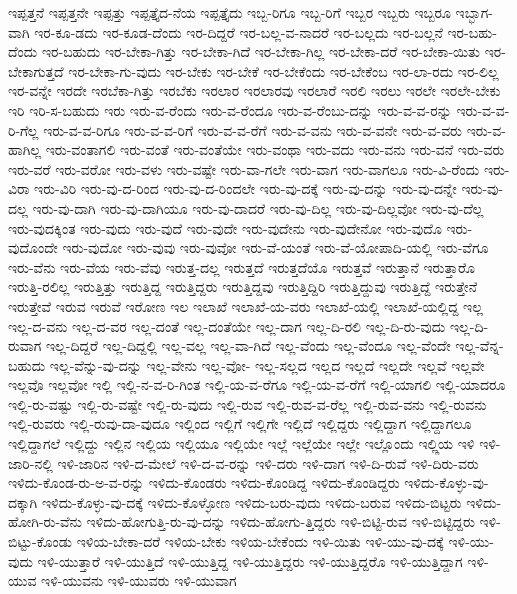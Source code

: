 {ಇಪ್ಪತ್ತನೆ
ಇಪ್ಪತ್ತನೇ
ಇಪ್ಪತ್ತು
ಇಪ್ಪತ್ತೈದ-ನೆಯ
ಇಪ್ಪತ್ತೈದು
ಇಬ್ಬ-ರಿಗೂ
ಇಬ್ಬ-ರಿಗೆ
ಇಬ್ಬರ
ಇಬ್ಬರು
ಇಬ್ಬರೂ
ಇಬ್ಭಾಗ-ವಾಗಿ
ಇರ-ಕೂ-ಡದು
ಇರ-ಕೂಡ-ದೆಂದು
ಇರ-ದಿದ್ದರೆ
ಇರ-ಬಲ್ಲ-ವ-ನಾದರೆ
ಇರ-ಬಲ್ಲದು
ಇರ-ಬಲ್ಲನೆ
ಇರ-ಬಹು-ದೆಂದು
ಇರ-ಬಹುದು
ಇರ-ಬೇಕಾ-ಗಿತ್ತು
ಇರ-ಬೇಕಾ-ಗಿದೆ
ಇರ-ಬೇಕಾ-ಗಿಲ್ಲ
ಇರ-ಬೇಕಾ-ದರೆ
ಇರ-ಬೇಕಾ-ಯಿತು
ಇರ-ಬೇಕಾಗುತ್ತದೆ
ಇರ-ಬೇಕಾ-ಗು-ವುದು
ಇರ-ಬೇಕು
ಇರ-ಬೇಕೆ
ಇರ-ಬೇಕೆಂದು
ಇರ-ಬೇಕೆಂಬ
ಇರ-ಲಾ-ರದು
ಇರ-ಲಿಲ್ಲ
ಇರ-ವನ್ನೇ
ಇರದೇ
ಇರಬೆಕಾ-ಗಿತ್ತು
ಇರಬೆಕು
ಇರಲಾರ
ಇರಲಾರವು
ಇರಲಾರೆ
ಇರಲಿ
ಇರಲು
ಇರಲೇ
ಇರಲೇ-ಬೇಕು
ಇರಿ
ಇರಿ-ಸ-ಬಹುದು
ಇರು
ಇರು-ವ-ರೆಂದು
ಇರು-ವ-ರೆಂದೂ
ಇರು-ವ-ರೆಂಬು-ದನ್ನು
ಇರು-ವ-ವ-ರನ್ನು
ಇರು-ವ-ವ-ರಿ-ಗೆಲ್ಲ
ಇರು-ವ-ವ-ರಿಗೂ
ಇರು-ವ-ವ-ರಿಗೆ
ಇರು-ವ-ವ-ರೆಗೆ
ಇರು-ವ-ವನು
ಇರು-ವ-ವನೇ
ಇರು-ವ-ವರು
ಇರು-ವ-ಹಾಗಿಲ್ಲ
ಇರು-ವಂತಾಗಲಿ
ಇರು-ವಂತೆ
ಇರು-ವಂತೆಯೇ
ಇರು-ವಂಥಾ
ಇರು-ವದು
ಇರು-ವನು
ಇರು-ವನೆ
ಇರು-ವರು
ಇರು-ವರೆ
ಇರು-ವರೋ
ಇರು-ವಳು
ಇರು-ವಷ್ಟೇ
ಇರು-ವಾ-ಗಲೇ
ಇರು-ವಾಗ
ಇರು-ವಾಗಲೂ
ಇರು-ವಿ-ರೆಂದು
ಇರು-ವಿರಾ
ಇರು-ವಿರಿ
ಇರು-ವು-ದ-ರಿಂದ
ಇರು-ವು-ದ-ರಿಂದಲೇ
ಇರು-ವು-ದಕ್ಕೆ
ಇರು-ವು-ದನ್ನು
ಇರು-ವು-ದನ್ನೇ
ಇರು-ವು-ದಲ್ಲ
ಇರು-ವು-ದಾಗಿ
ಇರು-ವು-ದಾಗಿಯೂ
ಇರು-ವು-ದಾದರೆ
ಇರು-ವು-ದಿಲ್ಲ
ಇರು-ವು-ದಿಲ್ಲವೋ
ಇರು-ವು-ದೆಲ್ಲ
ಇರು-ವುದಕ್ಕಿಂತ
ಇರು-ವುದು
ಇರು-ವುದೆ
ಇರು-ವುದೇ
ಇರು-ವುದೇನು
ಇರು-ವುದೇನೋ
ಇರು-ವುದೊ
ಇರು-ವುದೊಂದೇ
ಇರು-ವುದೋ
ಇರು-ವುವು
ಇರು-ವುವೋ
ಇರು-ವೆ-ಯಂತೆ
ಇರು-ವೆ-ಯೋಪಾದಿ-ಯಲ್ಲಿ
ಇರು-ವೆಗೂ
ಇರು-ವೆನು
ಇರು-ವೆಯ
ಇರು-ವೆವು
ಇರುತ್ತ-ದಲ್ಲ
ಇರುತ್ತದೆ
ಇರುತ್ತದೆಯೊ
ಇರುತ್ತವೆ
ಇರುತ್ತಾನೆ
ಇರುತ್ತಾರೊ
ಇರುತ್ತಿ-ರಲಿಲ್ಲ
ಇರುತ್ತಿತ್ತು
ಇರುತ್ತಿದ್ದ
ಇರುತ್ತಿದ್ದರು
ಇರುತ್ತಿದ್ದವು
ಇರುತ್ತಿದ್ದಿರಿ
ಇರುತ್ತಿದ್ದುವು
ಇರುತ್ತಿದ್ದೆ
ಇರುತ್ತೇನೆ
ಇರುತ್ತೇವೆ
ಇರುವ
ಇರುವೆ
ಇರೋಣ
ಇಲ
ಇಲಾಖೆ
ಇಲಾಖೆ-ಯ-ವರು
ಇಲಾಖೆ-ಯಲ್ಲಿ
ಇಲಾಖೆ-ಯಲ್ಲಿದ್ದ
ಇಲ್ಲ
ಇಲ್ಲ-ದ-ವನು
ಇಲ್ಲ-ದ-ವರ
ಇಲ್ಲ-ದಂತೆ
ಇಲ್ಲ-ದಂತೆಯೇ
ಇಲ್ಲ-ದಾಗ
ಇಲ್ಲ-ದಿ-ರಲಿ
ಇಲ್ಲ-ದಿ-ರು-ವುದು
ಇಲ್ಲ-ದಿ-ರುವಾಗ
ಇಲ್ಲ-ದಿದ್ದರೆ
ಇಲ್ಲ-ದಿದ್ದಲ್ಲಿ
ಇಲ್ಲ-ವಲ್ಲ
ಇಲ್ಲ-ವಾ-ಗಿದೆ
ಇಲ್ಲ-ವೆಂದು
ಇಲ್ಲ-ವೆಂದೂ
ಇಲ್ಲ-ವೆಂದೇ
ಇಲ್ಲ-ವೆನ್ನ-ಬಹುದು
ಇಲ್ಲ-ವೆನ್ನು-ವು-ದನ್ನು
ಇಲ್ಲ-ವೇನು
ಇಲ್ಲ-ವೋ-
ಇಲ್ಲ-ಸಲ್ಲದ
ಇಲ್ಲದ
ಇಲ್ಲದೆ
ಇಲ್ಲದೇ
ಇಲ್ಲವೆ
ಇಲ್ಲವೇ
ಇಲ್ಲವೊ
ಇಲ್ಲವೋ
ಇಲ್ಲಿ
ಇಲ್ಲಿ-ನ-ವ-ರಿ-ಗಿಂತ
ಇಲ್ಲಿ-ಯ-ವ-ರೆಗೂ
ಇಲ್ಲಿ-ಯ-ವ-ರೆಗೆ
ಇಲ್ಲಿ-ಯಾಗಲಿ
ಇಲ್ಲಿ-ಯಾದರೂ
ಇಲ್ಲಿ-ರು-ವಷ್ಟು
ಇಲ್ಲಿ-ರು-ವಷ್ಟೇ
ಇಲ್ಲಿ-ರು-ವುದು
ಇಲ್ಲಿ-ರುವ
ಇಲ್ಲಿ-ರುವ-ವ-ರೆಲ್ಲ
ಇಲ್ಲಿ-ರುವ-ವನು
ಇಲ್ಲಿ-ರುವನು
ಇಲ್ಲಿ-ರುವರು
ಇಲ್ಲಿ-ರುವು-ದಾ-ವುದೂ
ಇಲ್ಲಿಂದ
ಇಲ್ಲಿಗೆ
ಇಲ್ಲಿಗೇ
ಇಲ್ಲಿದೆ
ಇಲ್ಲಿದ್ದರು
ಇಲ್ಲಿದ್ದಾಗ
ಇಲ್ಲಿದ್ದಾಗಲೂ
ಇಲ್ಲಿದ್ದಾಗಲೆ
ಇಲ್ಲಿದ್ದು
ಇಲ್ಲಿನ
ಇಲ್ಲಿಯ
ಇಲ್ಲಿಯೂ
ಇಲ್ಲಿಯೇ
ಇಲ್ಲೆ
ಇಲ್ಲೆಯೇ
ಇಲ್ಲೇ
ಇಲ್ಲೊಂದು
ಇಲ್ಲ್ಲಿಯ
ಇಳಿ
ಇಳಿ-ಜಾರಿ-ನಲ್ಲಿ
ಇಳಿ-ಜಾರಿನ
ಇಳಿ-ದ-ಮೇಲೆ
ಇಳಿ-ದ-ವ-ರನ್ನು
ಇಳಿ-ದರು
ಇಳಿ-ದಾಗ
ಇಳಿ-ದಿ-ರುವೆ
ಇಳಿ-ದಿರು-ವರು
ಇಳಿದು-ಕೊಂಡ-ರು-ಅ-ವ-ರನ್ನು
ಇಳಿದು-ಕೊಂಡರು
ಇಳಿದು-ಕೊಂಡಿದ್ದ
ಇಳಿದು-ಕೊಂಡಿದ್ದರು
ಇಳಿದು-ಕೊಳ್ಳು-ವು-ದಕ್ಕಾಗಿ
ಇಳಿದು-ಕೊಳ್ಳು-ವು-ದಕ್ಕೆ
ಇಳಿದು-ಕೊಳ್ಳೋಣ
ಇಳಿದು-ಬರು-ವುದು
ಇಳಿದು-ಬರುವ
ಇಳಿದು-ಬಿಟ್ಟರು
ಇಳಿದು-ಹೋಗಿ-ರು-ವೆನು
ಇಳಿದು-ಹೋಗುತ್ತಿ-ರು-ವು-ದನ್ನು
ಇಳಿದು-ಹೋಗು-ತ್ತಿದ್ದರು
ಇಳಿ-ಬಿಟ್ಟಿ-ರುವ
ಇಳಿ-ಬಿಟ್ಟಿದ್ದರು
ಇಳಿ-ಬಿಟ್ಟು-ಕೊಂಡು
ಇಳಿಯ-ಬೇಕಾ-ದರೆ
ಇಳಿಯ-ಬೇಕು
ಇಳಿಯ-ಬೇಕೆಂದು
ಇಳಿ-ಯಿತು
ಇಳಿ-ಯು-ವು-ದಕ್ಕೆ
ಇಳಿ-ಯು-ವುದು
ಇಳಿ-ಯುತ್ತಾರೆ
ಇಳಿ-ಯುತ್ತಿದೆ
ಇಳಿ-ಯುತ್ತಿದ್ದ
ಇಳಿ-ಯುತ್ತಿದ್ದರು
ಇಳಿ-ಯುತ್ತಿದ್ದರೊ
ಇಳಿ-ಯುತ್ತಿದ್ದಾಗ
ಇಳಿ-ಯುವ
ಇಳಿ-ಯುವನು
ಇಳಿ-ಯುವರು
ಇಳಿ-ಯುವಾಗ
}
